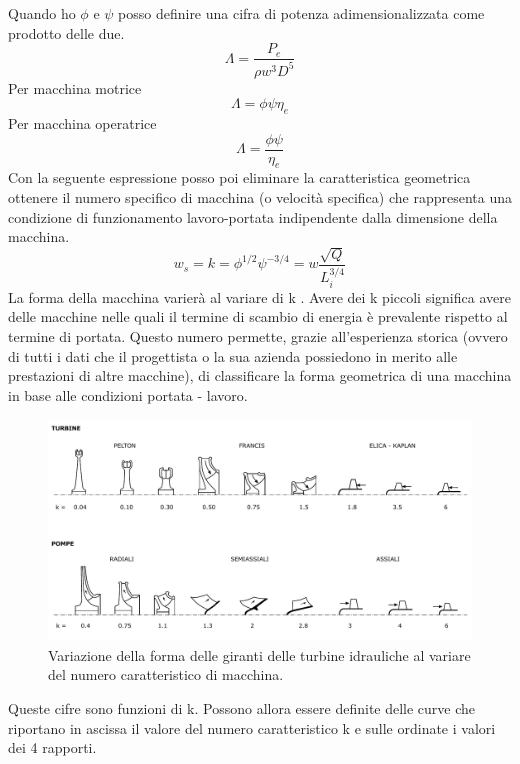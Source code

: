 Quando ho $\phi$ e $\psi$ posso definire una cifra di potenza adimensionalizzata come prodotto delle due.
\begin{equation}
\Lambda = \frac{P_e}{\rho w^3 D^5}
\end{equation}
Per macchina motrice
\begin{equation}
\Lambda = \phi \psi \eta_e
\end{equation}
Per macchina operatrice
\begin{equation}
\Lambda = \frac{\phi \psi}{\eta_e}
\end{equation}
Con la seguente espressione posso poi eliminare la caratteristica geometrica ottenere il numero specifico di macchina (o velocità specifica) che rappresenta una condizione di funzionamento lavoro-portata indipendente dalla dimensione della macchina. 
\begin{equation}
w_s = k = \phi^{1/2} \psi^{-3/4} = w \frac{\sqrt{Q}}{L_i^{3/4}}
\end{equation}
La forma della macchina varierà al variare di k . Avere dei k piccoli signiﬁca avere delle macchine nelle quali il termine di scambio di energia è prevalente rispetto al termine di portata. Questo numero permette, grazie all’esperienza storica (ovvero di tutti i dati che il progettista o la sua azienda possiedono in merito alle prestazioni di altre macchine), di classiﬁcare la forma geometrica di una macchina in base alle condizioni portata - lavoro.
\begin{figure}[h!]
\centering
  \includegraphics[width=\textwidth]{fig/numcar.pdf}
\caption{Variazione della forma delle giranti delle turbine idrauliche al variare del numero caratteristico di macchina.}
\label{fig:numcar}
\end{figure}
Queste cifre sono funzioni di k. Possono allora essere deﬁnite delle curve che riportano in ascissa il valore del numero caratteristico k e sulle ordinate i valori dei 4 rapporti.
